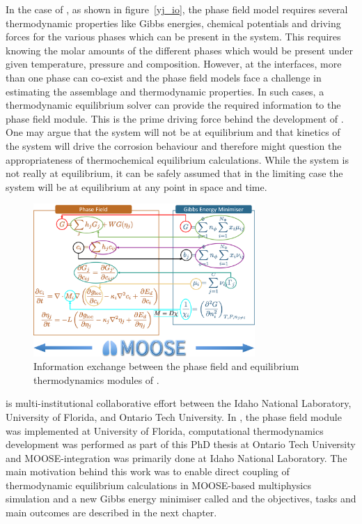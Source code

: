 	In the case of {\YJ}, as shown in figure~\ref{yj_io}, the phase field model requires several thermodynamic properties like Gibbs energies, chemical potentials and driving forces for the various phases which can be present in the system. This requires knowing the molar amounts of the different phases which would be present under given temperature, pressure and composition. However, at the interfaces, more than one phase can co-exist and the phase field models face a challenge in estimating the assemblage and thermodynamic properties. In such cases, a thermodynamic equilibrium solver can provide the required information to the phase field module. This is the prime driving force behind the development of {\GEM}. One may argue that the system will not be at equilibrium and that kinetics of the system will drive the corrosion behaviour and therefore might question the appropriateness of thermochemical equilibrium calculations. While the system is not really at equilibrium, it can be safely assumed that in the limiting case the system will be at equilibrium at any point in space and time.
	\begin{figure}[htb]
		\centering
		\includegraphics[width=0.75\textwidth]{figures/chapter-1/YJ_PF_IO.png}
		\caption{Information exchange between the phase field and equilibrium thermodynamics modules of \YJ.}
		\label{fig:yj_io}
	\end{figure} 	

	{\YJ} is multi-institutional collaborative effort between the Idaho National Laboratory, University of Florida, and Ontario Tech University.  In {\YJ}, the phase field module was implemented at University of Florida, computational thermodynamics development was performed as part of this PhD thesis at Ontario Tech University and MOOSE-integration was primarily done at Idaho National Laboratory. The main motivation behind this work was to enable direct coupling of thermodynamic equilibrium calculations in MOOSE-based multiphysics simulation and a new Gibbs energy minimiser called {\GEM} and the objectives, tasks and main outcomes are described in the next chapter.